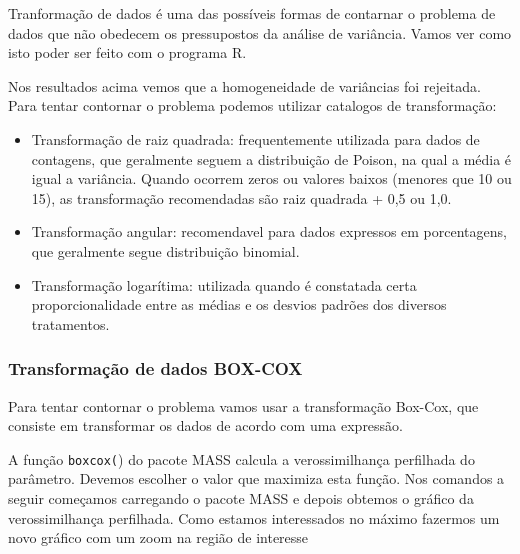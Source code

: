 \documentclass[
]{book}
\newenvironment{Shaded}{\begin{snugshade}}{\end{snugshade}}
\newcommand{\KeywordTok}[1]{\textcolor[rgb]{0.13,0.29,0.53}{\textbf{#1}}}
\newcommand{\NormalTok}[1]{#1}
\newcommand{\OperatorTok}[1]{\textcolor[rgb]{0.81,0.36,0.00}{\textbf{#1}}}
\newcommand{\StringTok}[1]{\textcolor[rgb]{0.31,0.60,0.02}{#1}}
\begin{document}
Tranformação de dados é uma das possíveis formas de contarnar o problema de dados que não obedecem os pressupostos da análise de variância. Vamos ver como isto poder ser feito com o programa R.

Nos resultados acima vemos que a homogeneidade de variâncias foi rejeitada. Para tentar contornar o problema podemos utilizar catalogos de transformação:

\begin{itemize}
\item
  Transformação de raiz quadrada: frequentemente utilizada para dados de contagens, que geralmente seguem a distribuição de Poison, na qual a média é igual a variância. Quando ocorrem zeros ou valores baixos (menores que 10 ou 15), as transformação recomendadas são raiz quadrada + 0,5 ou 1,0.
\item
  Transformação angular: recomendavel para dados expressos em porcentagens, que geralmente segue distribuição binomial.
\item
  Transformação logarítima: utilizada quando é constatada certa proporcionalidade entre as médias e os desvios padrões dos diversos tratamentos.
\end{itemize}

\begin{Shaded}
\end{Shaded}

\hypertarget{transformauxe7uxe3o-de-dados-box-cox}{%
\subsubsection{Transformação de dados BOX-COX}\label{transformauxe7uxe3o-de-dados-box-cox}}

Para tentar contornar o problema vamos usar a transformação Box-Cox, que consiste em transformar os dados de acordo com uma expressão.

A função \texttt{boxcox(}) do pacote MASS calcula a verossimilhança perfilhada do parâmetro. Devemos escolher o valor que maximiza esta função. Nos comandos a seguir começamos carregando o pacote MASS e depois obtemos o gráfico da verossimilhança perfilhada. Como estamos interessados no máximo fazermos um novo gráfico com um zoom na região de interesse
\end{document}
